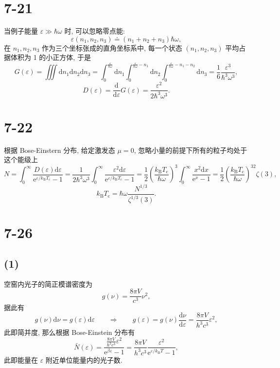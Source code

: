 \documentclass[
    lang=cn,
    column=onecolumn
]{spArticle}
\begin{document}
    \section{7-21}
        当例子能量 $\varepsilon \gg \hbar \omega $ 时, 可以忽略零点能:
        $$
        \varepsilon \left( n_1,n_2,n_3 \right) \doteq \left( n_1+n_2+n_3 \right) \hbar \omega ,
        $$
        在 $n_1,n_2,n_3$ 作为三个坐标张成的直角坐标系中, 每一个状态 $(n_1,n_2,n_3)$ 平均占据体积为 1 的小正方体, 于是
        $$
        G\left( \varepsilon \right) =\iiint{\mathrm{d}n_1\mathrm{d}n_2\mathrm{d}n_3}=\int_0^{\frac{\varepsilon}{\hbar \omega}}{\mathrm{d}n_1\int_0^{\frac{\varepsilon}{\hbar \omega}-n_1}{\mathrm{d}n_2\int_0^{\frac{\varepsilon}{\hbar \omega}-n_1-n_2}{\mathrm{d}n_3}=\frac{1}{6}\frac{\varepsilon ^3}{\hbar ^3\omega ^3}}},
        $$
        $$
        D\left( \varepsilon \right) =\frac{\mathrm{d}}{\mathrm{d}\varepsilon}G\left( \varepsilon \right) =\frac{\varepsilon ^2}{2\hbar ^3\omega ^3}.
        $$

    \section{7-22}
        根据 Bose-Einstern 分布, 给定激发态 $\mu=0$, 忽略小量的前提下所有的粒子均处于这个能级上
        $$
        N=\int_0^{\infty}{\frac{D\left( \varepsilon \right) \mathrm{d}\varepsilon}{\mathrm{e}^{\varepsilon /k_{\mathrm{B}}T_{\mathrm{c}}}-1}}=\frac{1}{2\hbar ^3\omega ^3}\int_0^{\infty}{\frac{\varepsilon ^2\mathrm{d}\varepsilon}{\mathrm{e}^{\varepsilon /k_{\mathrm{B}}T_{\mathrm{c}}}-1}}=\frac{1}{2}\left( \frac{k_{\mathrm{B}}T_{\mathrm{c}}}{\hbar \omega} \right) ^3\int_0^{\infty}{\frac{x^2\mathrm{d}x}{\mathrm{e}^x-1}=\frac{1}{2}\left( \frac{k_{\mathrm{B}}T_{\mathrm{c}}}{\hbar \omega} \right) ^32\zeta \left( 3 \right)},
        $$
        $$
        k_{\mathrm{B}}T_{\mathrm{c}}=\hbar \omega \frac{N^{1/3}}{\zeta ^{1/3}\left( 3 \right)}.
        $$

    \section{7-26}
        \subsection{(1)}
            空窑内光子的简正模谱密度为
            $$
            g\left( \nu \right) =\frac{8\pi V}{c^3}\nu ^2,
            $$
            据此有
            $$
            g\left( \nu \right) \mathrm{d}\nu =g\left( \varepsilon \right) \mathrm{d}\varepsilon \qquad \Longrightarrow \qquad g\left( \varepsilon \right) =g\left( \nu \right) \frac{\mathrm{d}\nu}{\mathrm{d}\varepsilon}=\frac{8\pi V}{h^3c^3}\varepsilon ^2,
            $$
            此即简并度, 那么根据 Bose-Einstein 分布有
            $$
            \bar{N}\left( \varepsilon \right) =\frac{\frac{8\pi V}{h^3c^3}\varepsilon ^2}{\mathrm{e}^{\beta \varepsilon}-1}=\frac{8\pi V}{h^3c^3}\frac{\varepsilon ^2}{\mathrm{e}^{\varepsilon /k_{\mathrm{B}}T}-1},
            $$
            此即能量在 $\varepsilon$ 附近单位能量内的光子数.
\end{document}
